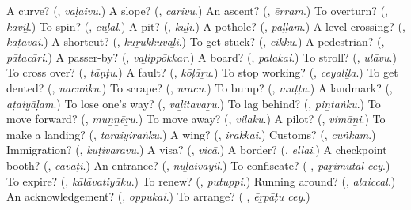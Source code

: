 \begin{tcolorbox}[breakable,colback=teal!4,colframe=teal!35!black,title={Before you move on}]
A curve? (\textbf{}, \emph{vaḷaivu}.) A slope? (\textbf{}, \emph{carivu}.) An ascent? (\textbf{}, \emph{ēṟṟam}.) To overturn? (\textbf{}, \emph{kaviḻ}.) To spin? (\textbf{}, \emph{cuḻal}.) A pit? (\textbf{}, \emph{kuḻi}.) A pothole? (\textbf{}, \emph{paḷḷam}.) A level crossing? (\textbf{}, \emph{kaṭavai}.) A shortcut? (\textbf{}, \emph{kuṟukkuvaḻi}.) To get stuck? (\textbf{}, \emph{cikku}.) A pedestrian? (\textbf{}, \emph{pātacāri}.) A passer-by? (\textbf{}, \emph{vaḻippōkkar}.) A board? (\textbf{}, \emph{palakai}.) To stroll? (\textbf{}, \emph{ulāvu}.) To cross over? (\textbf{}, \emph{tāṇṭu}.) A fault? (\textbf{}, \emph{kōḷāṟu}.) To stop working? (\textbf{}, \emph{ceyaliḻa}.) To get dented? (\textbf{}, \emph{nacuṅku}.) To scrape? (\textbf{}, \emph{uracu}.) To bump? (\textbf{}, \emph{muṭṭu}.) A landmark? (\textbf{}, \emph{aṭaiyāḷam}.) To lose one's way? (\textbf{}, \emph{vaḻitavaṟu}.) To lag behind? (\textbf{}, \emph{piṉtaṅku}.) To move forward? (\textbf{}, \emph{muṉṉēṟu}.) To move away? (\textbf{}, \emph{vilaku}.) A pilot? (\textbf{}, \emph{vimāṉi}.) To make a landing? (\textbf{}, \emph{taraiyiṟaṅku}.) A wing? (\textbf{}, \emph{iṟakkai}.) Customs? (\textbf{}, \emph{cuṅkam}.) Immigration? (\textbf{}, \emph{kuṭivaravu}.) A visa? (\textbf{}, \emph{vicā}.) A border? (\textbf{}, \emph{ellai}.) A checkpoint booth? (\textbf{}, \emph{cāvaṭi}.) An entrance? (\textbf{}, \emph{nuḻaivāyil}.) To confiscate? (\textbf{ }, \emph{paṟimutal cey}.) To expire? (\textbf{}, \emph{kālāvatiyāku}.) To renew? (\textbf{}, \emph{putuppi}.) Running around? (\textbf{}, \emph{alaiccal}.) An acknowledgement? (\textbf{}, \emph{oppukai}.) To arrange? (\textbf{ }, \emph{ēṟpāṭu cey}.)
\end{tcolorbox}
